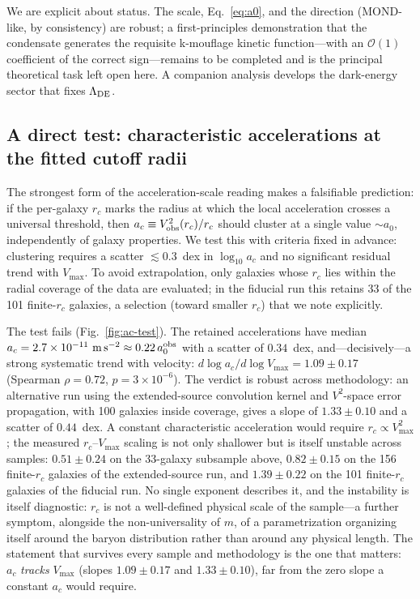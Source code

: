 \documentclass[11pt,a4paper]{article}
\begin{document}
We are explicit about status. The scale, Eq.~\eqref{eq:a0}, and the
direction (MOND-like, by consistency) are robust; a first-principles
demonstration that the condensate generates the requisite k-mouflage
kinetic function---with an $\mathcal{O}(1)$ coefficient of the correct
sign---remains to be completed and is the principal theoretical task
left open here. A companion analysis develops the dark-energy sector
that fixes $\Lambda_{\rm DE}$.

\subsection{A direct test: characteristic accelerations at the
fitted cutoff radii}
\label{sec:ac-test}

The strongest form of the acceleration-scale reading makes a
falsifiable prediction: if the per-galaxy $r_c$ marks the radius at
which the local acceleration crosses a universal threshold, then
$a_c \equiv V_{\rm obs}^2(r_c)/r_c$ should cluster at a single value
$\sim a_0$, independently of galaxy properties.  We test this with
criteria fixed in advance: clustering requires a scatter
$\lesssim 0.3$~dex in $\log_{10} a_c$ and no significant residual
trend with $V_{\max}$.  To avoid extrapolation, only galaxies whose
$r_c$ lies within the radial coverage of the data are evaluated; in
the fiducial run this retains 33 of the 101 finite-$r_c$ galaxies,
a selection (toward smaller $r_c$) that we note explicitly.

The test fails (Fig.~\ref{fig:ac-test}).  The retained accelerations
have median $a_c = 2.7\times10^{-11}\ \mathrm{m\,s^{-2}} \approx
0.22\,a_0^{\rm obs}$ with a scatter of $0.34$~dex, and---decisively---a
strong systematic trend with velocity:
$d\log a_c/d\log V_{\max} = 1.09 \pm 0.17$
(Spearman $\rho = 0.72$, $p = 3\times10^{-6}$).
The verdict is robust across methodology: an alternative run using
the extended-source convolution kernel and $V^2$-space error
propagation, with 100 galaxies inside coverage, gives a slope of
$1.33 \pm 0.10$ and a scatter of $0.44$~dex.
A constant characteristic acceleration would require
$r_c \propto V_{\max}^{2}$; the measured $r_c$--$V_{\max}$ scaling
is not only shallower but is itself unstable across samples:
$0.51 \pm 0.24$ on the 33-galaxy subsample above,
$0.82 \pm 0.15$ on the 156 finite-$r_c$ galaxies of the
extended-source run, and $1.39 \pm 0.22$ on the 101 finite-$r_c$
galaxies of the fiducial run.  No single exponent describes it, and
the instability is itself diagnostic: $r_c$ is not a well-defined
physical scale of the sample---a further symptom, alongside the
non-universality of $m$, of a parametrization organizing itself
around the baryon distribution rather than around any physical
length.  The statement that survives every sample and methodology
is the one that matters: $a_c$ \emph{tracks} $V_{\max}$ (slopes
$1.09 \pm 0.17$ and $1.33 \pm 0.10$), far from the zero slope a
constant $a_c$ would require.
\end{document}

